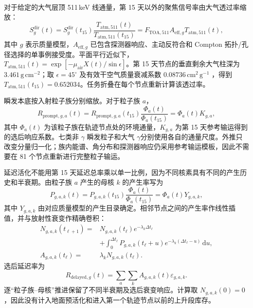 \documentclass[11pt]{article}
\newcommand{\revblue}[1]{\textcolor{revisionblue}{#1}}
\begin{document}
对于给定的大气层顶 511\,keV 线通量，第 15 天以外的聚焦信号率由大气透过率缩放：
\begin{equation}
 S^{\mathrm{dir}}_g(t)
 =S^{\mathrm{dir}}_g(t_{15})
 \frac{T_{\mathrm{atm},511}(t)}{T_{\mathrm{atm},511}(t_{15})}
 =F_{\mathrm{TOA},511}A_{\mathrm{eff},g}T_{\mathrm{atm},511}(t),
 \label{eq:mission_signal_zh}
\end{equation}
其中 $g$ 表示质量模型，$A_{\mathrm{eff},g}$ 已包含探测器响应、主动反符合和 Compton 拓扑/孔径选择的单事例接受度。平面平行近似下，$T_{\mathrm{atm},511}(t)=\exp[-\mu_{\mathrm{air}}X(t)/\sin\epsilon]$。第 15 天节点的垂直剩余大气柱深为 $3.461\,\mathrm{g\,cm^{-2}}$；取 $\epsilon=45^\circ$ 及有效干空气质量衰减系数 $0.08736\,\mathrm{cm^2\,g^{-1}}$ \cite{NISTXCOM}，得到 $T_{\mathrm{atm},511}(t_{15})=0.652034$。任务折叠在每个节点重新计算该透过率。

瞬发本底按入射粒子族分别缩放。对于粒子族 $a$，
\begin{equation}
 R_{\mathrm{prompt},g,a}(t)
 =R_{\mathrm{prompt},g,a}(t_{15})
 \frac{\Phi_a(t)}{\Phi_a(t_{15})}
 =\Phi_a(t)K_{g,a},
 \label{eq:prompt_source_response_zh}
\end{equation}
其中 $\Phi_a(t)$ 为该粒子族在轨迹节点处的环境通量，$K_{g,a}$ 为第 15 天参考输运得到的选后响应系数。七类非 $\gamma$ 瞬发粒子和\revblue{大气 $\gamma$}分别使用各自的通量尺度。外推只改变分量归一化；族内能谱、角分布和探测器响应仍采用参考输运模板，因此不需要在 81 个节点重新进行完整粒子输运。

延迟活化不能用第 15 天延迟总率乘以单一比例，因为不同核素具有不同的产生历史和半衰期。由粒子族 $a$ 产生的母核 $k$ 的产生率写为
\begin{equation}
 P_{g,a,k}(t)
 =P_{g,a,k}(t_{15})\frac{\Phi_a(t)}{\Phi_a(t_{15})}
 =\Phi_a(t)Y_{g,a,k},
 \label{eq:activation_production_zh}
\end{equation}
其中 $Y_{g,a,k}$ 由对应质量模型的产生目录确定。相邻节点之间的产生率作线性插值，并与放射性衰变作精确卷积：
\begin{equation}
 \begin{aligned}
 N_{g,a,k}(t_{\ell+1})={}&N_{g,a,k}(t_\ell)e^{-\lambda_k\Delta t_\ell}\\
 &+\int_0^{\Delta t_\ell}P_{g,a,k}(t_\ell+u)
 e^{-\lambda_k(\Delta t_\ell-u)}\,\mathrm du,\\
 A_{g,a,k}(t_\ell)={}&\lambda_kN_{g,a,k}(t_\ell).
 \end{aligned}
 \label{eq:delayed_inventory_zh}
\end{equation}
选后延迟率为
\begin{equation}
 R_{\mathrm{delayed},g}(t)=
 \sum_a\sum_kA_{g,a,k}(t)\varepsilon_{g,a,k}.
 \label{eq:delayed_selected_zh}
\end{equation}
逐“粒子族--母核”推进保留了不同半衰期及选后衰变响应。计算取 $N_{g,a,k}(0)=0$，因此没有计入地面预活化和进入第一个轨迹节点以前的上升段库存。
\end{document}
